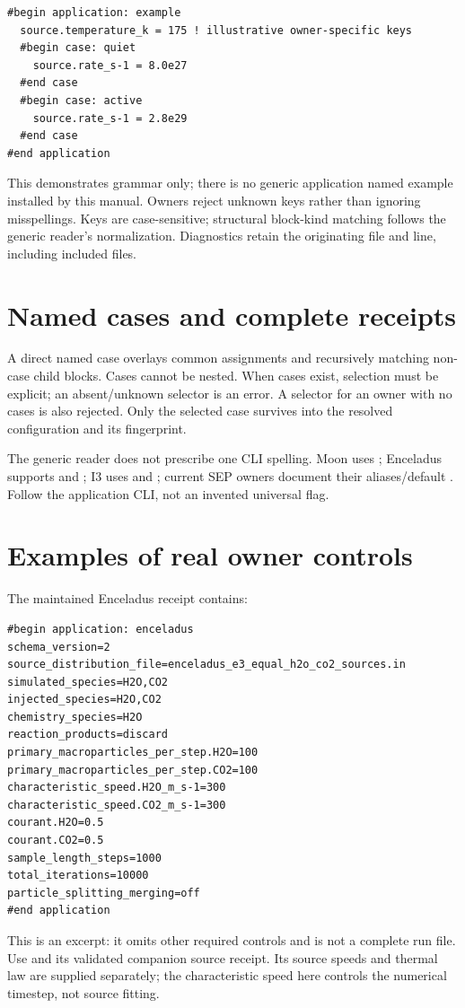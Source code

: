 \begin{lstlisting}
#begin application: example
  source.temperature_k = 175 ! illustrative owner-specific keys
  #begin case: quiet
    source.rate_s-1 = 8.0e27
  #end case
  #begin case: active
    source.rate_s-1 = 2.8e29
  #end case
#end application
\end{lstlisting}
This demonstrates grammar only; there is no generic application named
example installed by this manual. Owners reject unknown keys rather than
ignoring misspellings. Keys are case-sensitive; structural block-kind matching
follows the generic reader's normalization. Diagnostics retain the originating
file and line, including included files.

\section{Named cases and complete receipts}
A direct named case overlays common assignments and recursively matching
non-case child blocks. Cases cannot be nested. When cases exist, selection
must be explicit; an absent/unknown selector is an error. A selector for an
owner with no cases is also rejected. Only the selected case survives into
the resolved configuration and its fingerprint.

The generic reader does not prescribe one CLI spelling. Moon uses
; Enceladus supports  and ; I3 uses
 and ; current SEP owners document their aliases/default
. Follow the application CLI, not an invented universal flag.

\section{Examples of real owner controls}
The maintained Enceladus receipt contains:
\begin{lstlisting}
#begin application: enceladus
schema_version=2
source_distribution_file=enceladus_e3_equal_h2o_co2_sources.in
simulated_species=H2O,CO2
injected_species=H2O,CO2
chemistry_species=H2O
reaction_products=discard
primary_macroparticles_per_step.H2O=100
primary_macroparticles_per_step.CO2=100
characteristic_speed.H2O_m_s-1=300
characteristic_speed.CO2_m_s-1=300
courant.H2O=0.5
courant.CO2=0.5
sample_length_steps=1000
total_iterations=10000
particle_splitting_merging=off
#end application
\end{lstlisting}
This is an excerpt: it omits other required controls and is not a complete
run file. Use  and its validated companion source
receipt. Its source speeds and thermal law are supplied separately; the
characteristic speed here controls the numerical timestep, not source fitting.

